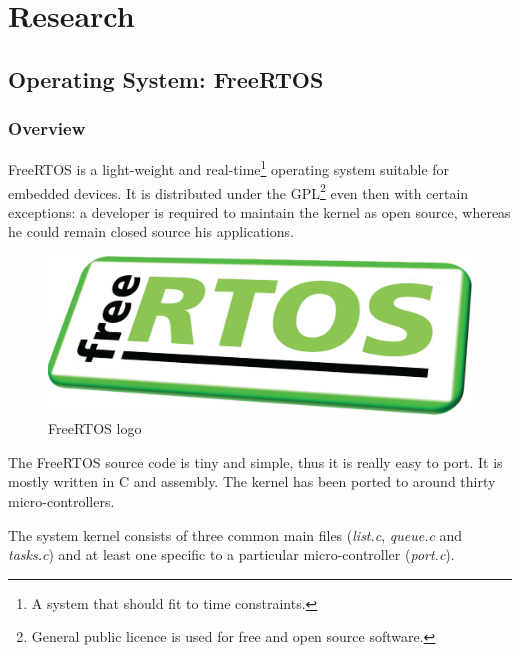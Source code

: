 \chapter{Research}\label{chap:research}

\section{Operating System: FreeRTOS}

\subsection{Overview}


\hspace{15mm}FreeRTOS is a light-weight and real-time\footnote{A system that should fit to time constraints.} operating system suitable for embedded devices. It is distributed under the GPL\footnote{General public licence is used for free and open source software.} even then with certain exceptions: a developer is required to maintain the kernel as open source, whereas he could remain closed source his applications.

\begin{figure}[h]
  \centering
  \includegraphics[scale=0.125]{images/freertos.jpg}
  \caption{FreeRTOS logo}
\end{figure}

The FreeRTOS source code is tiny and simple, thus it is really easy to port. It is mostly written in C and assembly. The kernel has been ported to around thirty micro-controllers.

The system kernel consists of three common main files (\textit{list.c}, \textit{queue.c} and \textit{tasks.c}) and at least one specific to a particular micro-controller (\textit{port.c}).



